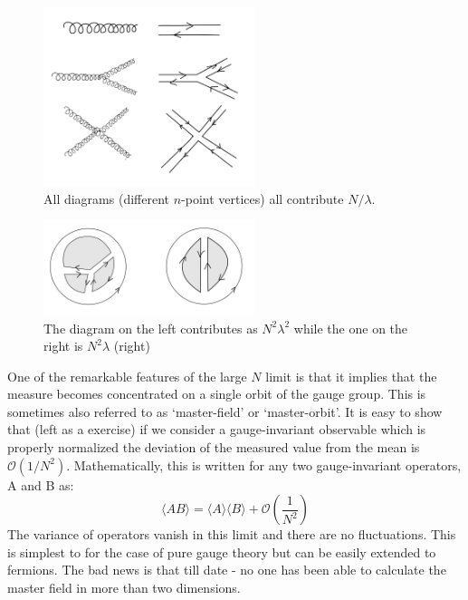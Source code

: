\documentclass[11pt]{article}
\begin{document}
\begin{figure}[htbp] 
	\centering 
	\includegraphics[width=0.55\textwidth]{figs/D1.jpg}
	\caption{\label{fig:D1}All diagrams (different $n$-point vertices) all contribute $N/\lambda$.}
\end{figure}

\begin{figure}[htbp] 
	\centering 
	\includegraphics[width=0.55\textwidth]{figs/D2.jpg}
	\caption{\label{fig:D2}The diagram on the left contributes as $N^2\lambda^2$ while the one on the right is $N^2\lambda$ (right)}
\end{figure}
One of the remarkable features of the large $N$ limit is that it implies that the 
measure becomes concentrated on a single orbit of the gauge group. This is sometimes
also referred to as `master-field' or `master-orbit'. It is easy to show that (left as a exercise) 
if we consider a gauge-invariant observable which is properly normalized the deviation of the 
measured value from the mean is $\mathcal{O}(1/N^2)$. Mathematically, this is written for 
any two gauge-invariant operators, A and B as: 
\begin{equation}
\langle AB \rangle = \langle A \rangle  \langle B \rangle + \mathscr{O}(\frac{1}{N^2})
\end{equation}
The variance of operators vanish in this limit and there are no fluctuations. This is simplest to
for the case of pure gauge theory but can be easily extended to fermions. The bad news is that till date - no one 
has been able to calculate the master field in more than two dimensions. 
\end{document}

